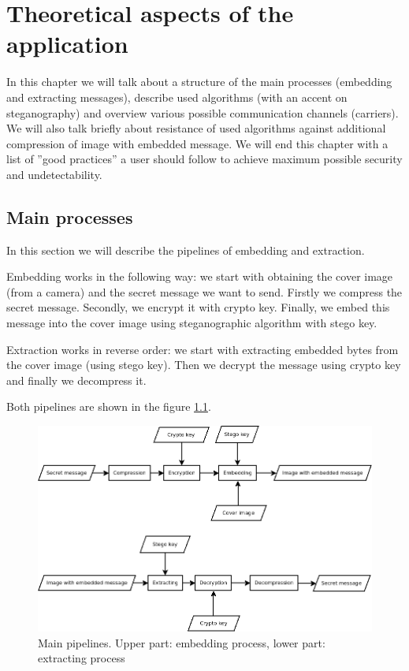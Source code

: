 \chapter{Theoretical aspects of the application}
\label{chap:theory}
In this chapter we will talk about a structure of the main
processes (embedding and extracting messages),
describe used algorithms (with an accent on steganography) and 
overview various possible communication channels (carriers).
We will also talk briefly about resistance of used algorithms
against additional compression of image with embedded message.
We will end this chapter with a list of ''good practices''
a user should follow to achieve maximum possible security
and undetectability.


\section{Main processes}
In this section we will describe
the pipelines of embedding and extraction. 

Embedding works in the following way: we start with obtaining the cover image
(from a camera) and the secret message we want to send. Firstly we compress 
the secret message. Secondly, we encrypt it with crypto key. Finally, we embed
this message into the cover image using steganographic algorithm with stego key.

Extraction works in reverse order: we start with extracting embedded bytes from
the cover image (using stego key). Then we decrypt the message using crypto key
and finally we decompress it. 

Both pipelines are shown in the figure \ref{img:CSflow}.

\begin{figure}
\centerline{\includegraphics[width=\textwidth]{diagrams/flow.png}}
\caption[Main pipelines]{Main pipelines. Upper part: embedding process, lower part: extracting process}
\label{img:CSflow}
\end{figure}



